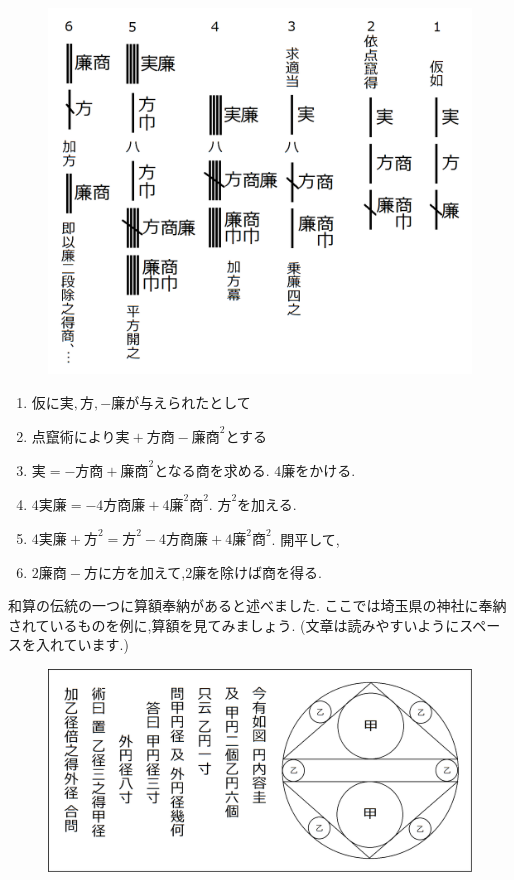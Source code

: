 \documentclass[./main]{subfiles}
\begin{document}
\begin{figure}[H]
\begin{center}
\includegraphics[width=13cm]{ookuwa2.png}
\end{center}
\end{figure}

\begin{enumerate}
\item 仮に$実,方,-廉$が与えられたとして
\item 点竄術により$実+方商-廉商^2$とする
\item $実=-方商+廉商^2$となる商を求める. $4廉$をかける.
\item $4実廉=-4方商廉+4 廉^2 商^2$. $方^2$を加える.
\item $4実廉+方^2 = 方^2 - 4方商廉 + 4 廉^2 商^2$. 開平して,
\item $2廉商-方$に方を加えて,$2廉$を除けば商を得る.
\end{enumerate}



和算の伝統の一つに算額奉納があると述べました. ここでは埼玉県の神社に奉納されているものを例に,算額を見てみましょう. (文章は読みやすいようにスペースを入れています.)

\begin{figure}[H]
\begin{center}
\includegraphics[width=13cm]{ookuwa3.png}
\end{center}
\end{figure}
\end{document}
